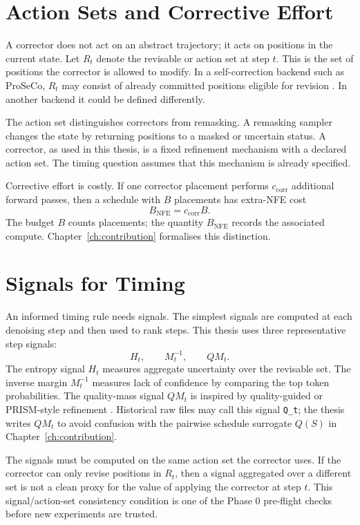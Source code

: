 \section{Action Sets and Corrective Effort}
\label{sec:ch5-action-sets}

A corrector does not act on an abstract trajectory; it acts on positions in
the current state. Let $R_t$ denote the revisable or action set at step $t$.
This is the set of positions the corrector is allowed to modify. In a
self-correction backend such as ProSeCo, $R_t$ may consist of already
committed positions eligible for revision \parencite{schiff2026proseco}. In
another backend it could be defined differently.

The action set distinguishes correctors from remasking. A remasking sampler
changes the state by returning positions to a masked or uncertain status. A
corrector, as used in this thesis, is a fixed refinement mechanism with a
declared action set. The timing question assumes that this mechanism is already
specified.

Corrective effort is costly. If one corrector placement performs
$c_{\mathrm{corr}}$ additional forward passes, then a schedule with $B$
placements has extra-NFE cost
\[
  B_{\mathrm{NFE}} = c_{\mathrm{corr}}B .
\]
The budget $B$ counts placements; the quantity $B_{\mathrm{NFE}}$ records the
associated compute. Chapter~\ref{ch:contribution} formalises this distinction.

\section{Signals for Timing}
\label{sec:ch5-signals}

An informed timing rule needs signals. The simplest signals are computed at
each denoising step and then used to rank steps. This thesis uses three
representative step signals:
\[
  H_t,\qquad M_t^{-1},\qquad QM_t .
\]
The entropy signal $H_t$ measures aggregate uncertainty over the revisable
set. The inverse margin $M_t^{-1}$ measures lack of confidence by comparing
the top token probabilities. The quality-mass signal $QM_t$ is inspired by
quality-guided or PRISM-style refinement \parencite{kim2025prism}. Historical
raw files may call this signal \texttt{Q\_t}; the thesis writes $QM_t$ to avoid
confusion with the pairwise schedule surrogate $Q(S)$ in
Chapter~\ref{ch:contribution}.

The signals must be computed on the same action set the corrector uses. If the
corrector can only revise positions in $R_t$, then a signal aggregated over a
different set is not a clean proxy for the value of applying the corrector at
step $t$. This signal/action-set consistency condition is one of the Phase 0
pre-flight checks before new experiments are trusted.

